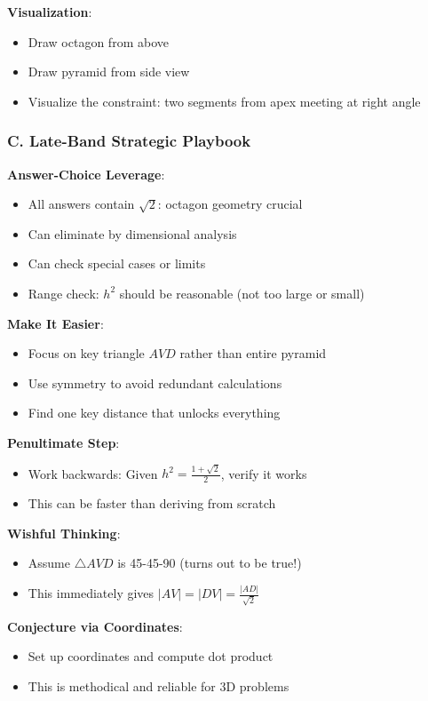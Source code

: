 \documentclass[12pt]{article}
\begin{document}
\begin{strategicbox}
\textbf{Visualization}:
\begin{itemize}
    \item Draw octagon from above
    \item Draw pyramid from side view
    \item Visualize the constraint: two segments from apex meeting at right angle
\end{itemize}

\subsubsection*{C. Late-Band Strategic Playbook}

\textbf{Answer-Choice Leverage}:
\begin{itemize}
    \item All answers contain $\sqrt{2}$: octagon geometry crucial
    \item Can eliminate by dimensional analysis
    \item Can check special cases or limits
    \item Range check: $h^2$ should be reasonable (not too large or small)
\end{itemize}

\textbf{Make It Easier}:
\begin{itemize}
    \item Focus on key triangle $AVD$ rather than entire pyramid
    \item Use symmetry to avoid redundant calculations
    \item Find one key distance that unlocks everything
\end{itemize}

\textbf{Penultimate Step}:
\begin{itemize}
    \item Work backwards: Given $h^2 = \frac{1+\sqrt{2}}{2}$, verify it works
    \item This can be faster than deriving from scratch
\end{itemize}

\textbf{Wishful Thinking}:
\begin{itemize}
    \item Assume $\triangle AVD$ is 45-45-90 (turns out to be true!)
    \item This immediately gives $|AV| = |DV| = \frac{|AD|}{\sqrt{2}}$
\end{itemize}

\textbf{Conjecture via Coordinates}:
\begin{itemize}
    \item Set up coordinates and compute dot product
    \item This is methodical and reliable for 3D problems
\end{itemize}

\end{strategicbox}
\end{document}
